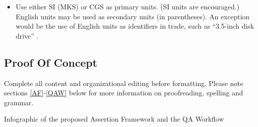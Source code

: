 \documentclass[conference]{IEEEtran}
\begin{document}
\begin{itemize}
\item Use either SI (MKS) or CGS as primary units. (SI units are encouraged.) English units may be used as secondary units (in parentheses). An exception would be the use of English units as identifiers in trade, such as ``3.5-inch disk drive'' \cite{sjr}.
\end{itemize}

\subsection{Proof Of Concept}\label{POC}

Complete all content and organizational editing before 
formatting. Please note sections \ref{AF}-\ref{QAW} below for more information on 
proofreading, spelling and grammar.




\renewcommand{\refname}{Appendix}

\begin{thebibliography}{00}
\makeatletter
\addtocounter{\@listctr}{2}
\makeatother
{} Infographic of the proposed Assertion Framework and the QA Workflow
\end{thebibliography}
\end{document}
